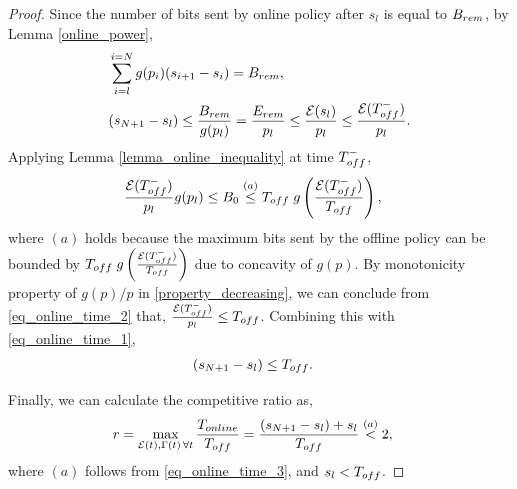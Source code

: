 \begin{proof}
Since the number of bits sent by online policy after ${s}_l$ is equal to $B_{\mbox{\scriptsize{rem}}}$, by Lemma \ref{online_power},
\begin{align}
&\sum_{i=l}^{i={N}}g(p_i)({s}_{i+1}-{s}_i)=B_{\mbox{\scriptsize{rem}}},
\\
&({s}_{{N}+1}-{s}_l)\le\frac{B_{\mbox{\scriptsize{rem}}}}{g(p_l)}=\frac{E_{\mbox{\scriptsize{rem}}}}{p_l}\le \frac{\ETx({s}_l)}{p_l}\le \frac{\ETx(T_{\mbox{\scriptsize{off}}}^-)}{p_l}.
\label{eq_online_time_1}  
\end{align}
Applying Lemma \ref{lemma_online_inequality} at time $T_{\mbox{\scriptsize{off}}}^-$,
\begin{align}
&\frac{\ETx(T_{\mbox{\scriptsize{off}}}^-)}{p_l}g(p_l)\le B_0\stackrel{(a)}{\le}T_{\mbox{\scriptsize{off}}}\; g\left(\frac{\ETx(T_{\mbox{\scriptsize{off}}}^-)}{T_{\mbox{\scriptsize{off}}}}\right),
\label{eq_online_time_2}
\end{align}
where $(a)$ holds because the maximum bits sent by the offline policy can be bounded by $T_{\mbox{\scriptsize{off}}}\; g\left(\frac{\ETx(T_{\mbox{\scriptsize{off}}}^-)}{T_{\mbox{\scriptsize{off}}}}\right)$ due to concavity of $g(p)$. By monotonicity property of $g(p)/p$ in \eqref{property_decreasing}, we can conclude from \eqref{eq_online_time_2} that, $\frac{\ETx(T_{\mbox{\scriptsize{off}}}^-)}{p_l}\le T_{\mbox{\scriptsize{off}}}$. 
Combining this with \eqref{eq_online_time_1},
\begin{align}
&({s}_{{N}+1}-{s}_l)\le T_{\mbox{\scriptsize{off}}}.
\label{eq_online_time_3}
\end{align} 

Finally, we can calculate the competitive ratio as,
\begin{align*}
&r=\displaystyle\max_{\ETx(t),\TRx(t)\hspace{0.5mm} \forall t}\dfrac{T_{\mbox{\scriptsize{online}}}}{T_{\mbox{\scriptsize{off}}}} = \dfrac{({s}_{{N}+1}-{s}_l)+{s}_l}{T_{\mbox{\scriptsize{off}}}} \stackrel{(a)}{<} 2,
\end{align*}
where $(a)$ follows from \eqref{eq_online_time_3}, and ${s}_l<T_{\mbox{\scriptsize{off}}}$.        
\end{proof}
